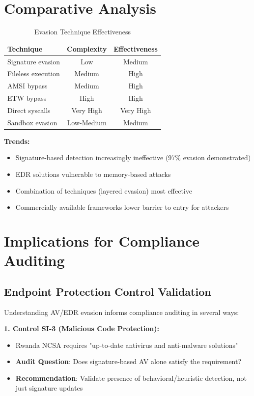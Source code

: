 \documentclass[11pt,conference]{IEEEtran}
\begin{document}
\section{Comparative Analysis}

\begin{table}[h]
\centering
\caption{Evasion Technique Effectiveness}
\begin{tabular}{|l|c|c|}
\hline
\textbf{Technique} & \textbf{Complexity} & \textbf{Effectiveness} \\
\hline
Signature evasion & Low & Medium \\
\hline
Fileless execution & Medium & High \\
\hline
AMSI bypass & Medium & High \\
\hline
ETW bypass & High & High \\
\hline
Direct syscalls & Very High & Very High \\
\hline
Sandbox evasion & Low-Medium & Medium \\
\hline
\end{tabular}
\end{table}

\textbf{Trends:}
\begin{itemize}
    \item Signature-based detection increasingly ineffective (97\% evasion demonstrated)
    \item EDR solutions vulnerable to memory-based attacks
    \item Combination of techniques (layered evasion) most effective
    \item Commercially available frameworks lower barrier to entry for attackers
\end{itemize}

\section{Implications for Compliance Auditing}

\subsection{Endpoint Protection Control Validation}

Understanding AV/EDR evasion informs compliance auditing in several ways:

\textbf{1. Control SI-3 (Malicious Code Protection):}
\begin{itemize}
    \item Rwanda NCSA requires "up-to-date antivirus and anti-malware solutions"
    \item \textbf{Audit Question}: Does signature-based AV alone satisfy the requirement?
    \item \textbf{Recommendation}: Validate presence of behavioral/heuristic detection, not just signature updates
\end{itemize}
\end{document}
